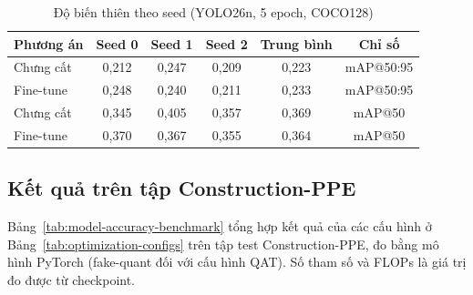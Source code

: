 \begin{table}[H]
\centering
\caption{Độ biến thiên theo seed (YOLO26n, 5 epoch, COCO128)}
\label{tab:pilot-seed}
\begin{tabular}{lccccc}
\toprule
\textbf{Phương án} & \textbf{Seed 0} & \textbf{Seed 1} & \textbf{Seed 2} & \textbf{Trung bình} & \textbf{Chỉ số}\\
\midrule
Chưng cất & 0,212 & 0,247 & 0,209 & 0,223 & mAP@50:95\\
Fine-tune & 0,248 & 0,240 & 0,211 & 0,233 & mAP@50:95\\
Chưng cất & 0,345 & 0,405 & 0,357 & 0,369 & mAP@50\\
Fine-tune & 0,370 & 0,367 & 0,355 & 0,364 & mAP@50\\
\bottomrule
\end{tabular}
\end{table}

\subsection{Kết quả trên tập Construction-PPE}

Bảng~\ref{tab:model-accuracy-benchmark} tổng hợp kết quả của các cấu hình ở
Bảng~\ref{tab:optimization-configs} trên tập test Construction-PPE, đo bằng mô
hình PyTorch (fake-quant đối với cấu hình QAT). Số tham số và FLOPs là giá trị đo
được từ checkpoint.

\begin{table}[H]
\centering
\caption{Kết quả các cấu hình tối ưu trên tập test Construction-PPE}
\label{tab:model-accuracy-benchmark}
\end{table}
